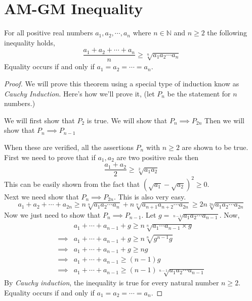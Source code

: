 \chapter{AM-GM Inequality}

\begin{theorem}[AM-GM Inequality]
    For all positive real numbers $a_{1}, a_{2}, \cdots, a_{n}$ where 
    $n \in \mathbb{N}$ and $n\geq 2$ the following inequality holds,
    \[
        \frac{a_{1} + a_{2} + \cdots + a_{n}}{n} \geq \sqrt[n]{a_{1}a_{2}\cdots a_{n}}
    \]
    Equality occurs if and only if $a_{1} = a_{2} = \cdots = a_{n}$.
\end{theorem}
\begin{proof}
    We will prove this theorem using a special type of induction know as 
    \emph{Cauchy Induction}. Here's how we'll prove it, 
    (let $P_{n}$ be the statement for $n$ numbers.)
    \begin{itemize}
        \ii We will first show that $P_{2}$ is true. 
        \ii We will show that $P_{n} \implies P_{2n}$
        \ii Then we will show that $P_{n} \implies P_{n-1}$
    \end{itemize}
    When these are verified, all the assertions $P_{n}$ with $n \geq 2$ are shown to be true. \\
    First we need to prove that if $a_{1}, a_{2}$ are two positive reals then 
    \[
        \frac{a_{1} + a_{2}}{2} \geq \sqrt[2]{a_{1} a_{2}}
    \]
    This can be easily shown from the fact that $(\sqrt{a_{1}} - \sqrt{a_{2}})^{2} \geq 0$. \\
    Next we need show that $P_{n} \implies P_{2n}$. This is also very easy.
    \[
    a_{1} + a_{2} + \cdots + a_{2n} 
    \geq n\sqrt[n]{a_{1}a_{2} \cdots a_{n}}+ n\sqrt[n]{a_{n+1}a_{n+2} \cdots a_{2n}} 
    \geq 2n\sqrt[2n]{a_{1}a_{2} \cdots a_{2n}}
    \]
    Now we just need to show that $P_{n} \implies P_{n-1}$. Let $g = \sqrt[n-1]{a_{1}a_{2} \cdots a_{n-1}}$. 
    Now,
    \begin{align*}
                 & a_{1} + \cdots + a_{n-1} + g \geq n\sqrt[n]{a_{1}\cdots a_{n-1} \times g} \\
        \implies & a_{1} + \cdots + a_{n-1} + g \geq n\sqrt[n]{g^{n-1}g} \\
        \implies & a_{1} + \cdots + a_{n-1} + g \geq ng \\
        \implies & a_{1} + \cdots + a_{n-1} \geq (n-1)g \\
        \implies & a_{1} + \cdots + a_{n-1} \geq (n-1)\sqrt[n-1]{a_{1}a_{2}\cdots a_{n-1}}
    \end{align*}
    By \emph{Cauchy induction}, the inequality is true for every natural number $n\geq 2$. 
    Equality occurs if and only if $a_{1} = a_{2} = \cdots = a_{n}$.
\end{proof}

